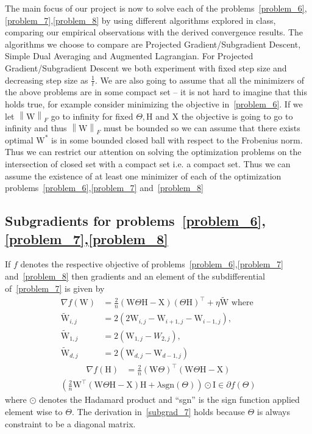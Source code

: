 \documentclass{article}
\newcommand{\0}{\mathrm{0}}
\newcommand{\1}{\mathrm{1}}
\renewcommand{\H}{\mathrm{H}}
\newcommand{\I}{\mathrm{I}}
\newcommand{\W}{\mathrm{W}}
\newcommand{\X}{\mathrm{X}}
\newcommand{\norm}[1]{\left\| #1 \right\|}
\begin{document}
The main focus of our project is now to solve each of the problems~\ref{problem_6},\ref{problem_7},\ref{problem_8} by using different algorithms explored in class, comparing our empirical observations with the derived convergence results. The algorithms we choose to compare are Projected Gradient/Subgradient Descent, Simple Dual Averaging and Augmented Lagrangian. For Projected Gradient/Subgradient Descent we both experiment with fixed step size and decreasing step size as $\frac{1}{t}$. We are also going to assume that all the minimizers of the above problems are in some compact set -- it is not hard to imagine that this holds true, for example consider minimizing the objective in~\ref{problem_6}. If we let $\norm{\W}_F$ go to infinity for fixed $\Theta,\H$ and $\X$ the objective is going to go to infinity and thus $\norm{\W}_F$ must be bounded so we can assume that there exists optimal $\W^*$ is in some bounded closed ball with respect to the Frobenius norm. Thus we can restrict our attention on solving the optimization problems on the intersection of closed set with a compact set i.e. a compact set. Thus we can assume the existence of at least one minimizer of each of the optimization problems~\ref{problem_6},\ref{problem_7} and~\ref{problem_8}
\subsection{Subgradients for problems~\ref{problem_6},\ref{problem_7},\ref{problem_8}}
If $f$ denotes the respective objective of problems~\ref{problem_6},\ref{problem_7} and~\ref{problem_8} then gradients and an element of the subdifferential of~\ref{problem_7} is given by
\begin{equation}
  \label{subgrad_6}
  \begin{aligned}
    \nabla f(\W) &= \frac{2}{n} \left(\W\Theta\H - \X\right)\left(\Theta\H\right)^\top + \eta\tilde{\W} \text{ where }\\
    \tilde{\W}_{i,j} &= 2\left(2\W_{i,j} - \W_{i+1,j} - \W_{i-1,j}\right),\\
    \tilde{\W}_{1,j} &= 2\left(\W_{1,j} - W_{2,j}\right),\\
    \tilde{\W}_{d,j} &= 2\left(\W_{d,j} - \W_{d-1,j}\right)
    \end{aligned}
\end{equation}
\begin{equation}
  \label{subgrad_8}
  \begin{aligned}
    \nabla f(\H)  &= \frac{2}{n}\left(\W\Theta\right)^\top\left(\W\Theta\H - \X\right)
  \end{aligned}
\end{equation}
\begin{equation}
  \label{subgrad_7}
  \begin{aligned}
    \left(\frac{2}{n}\W^\top\left(\W\Theta\H-\X\right)\H +\lambda\text{sgn}\left(\Theta \right)\right)\odot\I \in \partial f(\Theta)
  \end{aligned}
\end{equation}
where $\odot$ denotes the Hadamard product and ``sgn'' is the sign function applied element wise to $\Theta$. The derivation in~\ref{subgrad_7} holds because $\Theta$ is always constraint to be a diagonal matrix.
\end{document}
